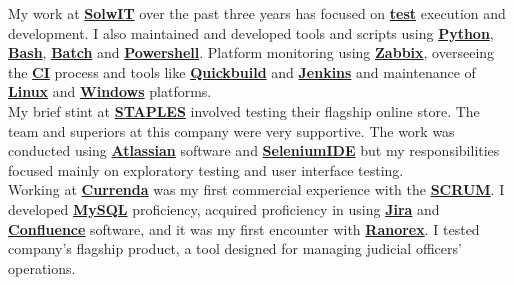 \documentclass[theme]{cv_einstein}
\begin{document}
\begin{paracol}{2}
\begin{rightcolumn}
            {My work at \href{https://solwit.com/}{\textbf{SolwIT}} over the past three years has focused on \href{https://docs.pytest.org/}{\textbf{test}} execution and development. I also maintained and developed tools and scripts using \href{https://www.python.org/}{\textbf{Python}}, \href{https://www.gnu.org/}{\textbf{Bash}}, \href{https://learn.microsoft.com/en-us/windows-server/administration/windows-commands/windows-commands}{\textbf{Batch}} and \href{https://learn.microsoft.com/pl-pl/powershell/}{\textbf{Powershell}}. Platform monitoring using \href{https://www.zabbix.com/}{\textbf{Zabbix}}, overseeing the \href{https://en.wikipedia.org/wiki/Continuous_integration}{\textbf{CI}} process and tools like \href{https://www.pmease.com/}{\textbf{Quickbuild}} and \href{https://www.jenkins.io/}{\textbf{Jenkins}} and maintenance of \href{https://www.linux.org/}{\textbf{Linux}} and \href{https://www.microsoft.com/}{\textbf{Windows}} platforms.}
            \vspace{\itemspace}\\
            {My brief stint at \href{https://www.staples.com/}{\textbf{STAPLES}} involved testing their flagship online store. The team and superiors at this company were very supportive. The work was conducted using \href{https://www.atlassian.com/}{\textbf{Atlassian}} software and \href{https://www.selenium.dev/selenium-ide/}{\textbf{SeleniumIDE}} but my responsibilities focused mainly on exploratory testing and user interface testing.}
            \vspace{\itemspace}\\
            {Working at \href{https://www.currenda.pl/}{\textbf{Currenda}} was my first commercial experience with the \href{https://www.scrum.org/}{\textbf{SCRUM}}. I developed \href{https://www.mysql.com/}{\textbf{MySQL}} proficiency, acquired proficiency in using \href{https://www.atlassian.com/pl/software/jira}{\textbf{Jira}} and \href{https://www.atlassian.com/pl/software/confluence}{\textbf{Confluence}} software, and it was my first encounter with \href{https://www.ranorex.com/}{\textbf{Ranorex}}. I tested company's flagship product, a tool designed for managing judicial officers' operations.}
            \vspace{\itemspace}\\

\end{rightcolumn}
\end{paracol}
\end{document}
